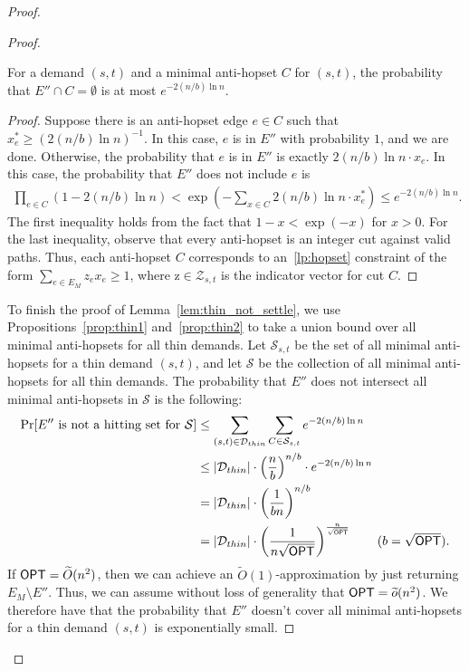 \begin{proof}
\begin{proof}
        \begin{proposition} \label{prop:thin2}
            For a demand $(s,t)$ and a minimal anti-hopset $C$ for $(s,t)$, the probability that $E'' \cap C = \emptyset$ is at most $e^{-2(n/b)\ln{n}}$.
        \end{proposition}
        \begin{proof}
            Suppose there is an anti-hopset edge $e \in C$ such that $x_e^* \geq (2(n/b)\ln{n})^{-1}$. In this case, $e$ is in $E''$ with probability $1$, and we are done. Otherwise, the probability that $e$ is in $E''$ is exactly $2(n/b)\ln{n} \cdot x_e$. In this case, the probability that $E''$ does not include $e$ is 
            \begin{align*}
                \prod_{e \in C} \left( 1 - 2 (n/b) \ln{n} \right) < \exp{\left(-\sum_{x \in C} 2 (n/b) \ln{n} \cdot x^*_e \right)} \leq e^{-2 (n/b) \ln{n}}.
            \end{align*}
            The first inequality holds from the fact that $1-x < \exp{(-x)}$ for $x > 0$. For the  last inequality, observe that every anti-hopset is an integer cut against valid paths. Thus, each anti-hopset $C$ corresponds to an~\ref{lp:hopset} constraint of the form $\sum_{e \in E_M} z_e x_e \geq 1$, where $\bm{\mathrm{z}} \in \mathcal{Z}_{s,t}$ is the indicator vector for cut $C$.
        \end{proof}
        
    To finish the proof of Lemma~\ref{lem:thin_not_settle}, we use Propositions~\ref{prop:thin1} and~\ref{prop:thin2} to take a union bound over all minimal anti-hopsets for all thin demands. Let $\mathcal{S}_{s,t}$ be the set of all minimal anti-hopsets for a thin demand $(s,t)$, and let $\mathcal{S}$ be the collection of all minimal anti-hopsets for all thin demands. The probability that $E''$ does not intersect all minimal anti-hopsets in $\mathcal{S}$ is the following:
    \begin{align*}
        \Pr[E'' \text{ is not a hitting set for } \mathcal{S}] &\leq  \sum_{(s,t) \in \mathcal{D}_{thin}} \sum_{C \in \mathcal{S}_{s,t}} e^{-2 (n/b) \ln{n}} \\
        &\leq  |\mathcal{D}_{thin}| \cdot \left( \frac{n}{b} \right)^{n/b} \cdot e^{-2 (n/b) \ln{n}} \\
        &= |\mathcal{D}_{thin}| \cdot \left( \frac{1}{b n} \right)^{n/b} \\
        &= |\mathcal{D}_{thin}| \cdot \left( \frac{1}{n \sqrt{{\opt}}} \right)^{\frac{n}{\sqrt{{\opt}}}} \tag{$b = \sqrt{{\opt}}$}.
    \end{align*}
    If ${{\sf OPT}} = \widetilde{O}(n^{2})$, then we can achieve an $\widetilde{O}(1)$-approximation by just returning $E_M \setminus E''$. Thus, we can assume without loss of generality that ${{\sf OPT}} = \widetilde{o}(n^{2})$.  We therefore have that the probability that $E''$ doesn't cover all minimal anti-hopsets for a thin demand $(s,t)$ is exponentially small.
    \end{proof}

\end{proof}




